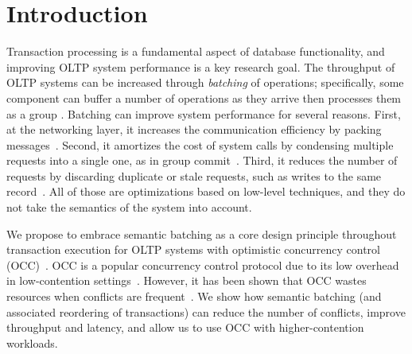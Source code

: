 \section{Introduction}\label{sec:intro}

Transaction processing is a fundamental aspect of database functionality, and improving OLTP system performance is a key research goal. The throughput of OLTP systems can be increased through \emph{batching} of operations; specifically, some component can buffer a number of operations as they arrive then processes them as a group \cite{friedman1997packing,debrabant2013anti,hagmann1987reimplementing}.
Batching can improve system performance for several reasons. First, at the networking layer, it increases the communication efficiency by packing messages~\cite{ding2015centiman,friedman1997packing}. Second, it amortizes the cost of system calls by condensing multiple requests into a single one, as in group commit~\cite{debrabant2013anti,hagmann1987reimplementing}. Third, it reduces the number of requests by discarding duplicate or stale requests, such as writes to the same record~\cite{faleiro2014lazy}. All of those are optimizations based on low-level techniques, and they do not take the semantics of the system into account.

We propose to embrace semantic batching as a core design principle throughout transaction execution for OLTP systems with optimistic concurrency control (OCC)~\cite{kung81tods}.
OCC is a popular concurrency control protocol due to its low overhead in low-contention
settings~\cite{adya97podc, baker11cidr, bernstein2015optimizing,bernstein11cidr,
bernstein11vldb, corbett12osdi,warp, patterson12vldb,peng10osdi,larson2011high}. However, it has been shown that OCC
wastes resources when conflicts are frequent~\cite{agrawal1987concurrency}. We
show how semantic batching (and associated reordering of transactions) can reduce the number of conflicts, improve
throughput and latency, and allow us to use OCC with higher-contention workloads.


